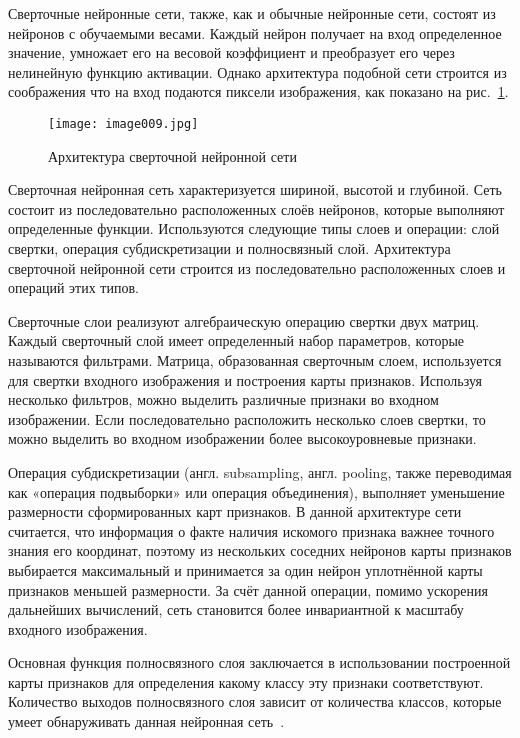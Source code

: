 Сверточные нейронные сети, также, как и обычные нейронные сети, состоят из нейронов с обучаемыми весами. Каждый нейрон получает на вход определенное значение, умножает его на весовой коэффициент и преобразует его через нелинейную функцию активации. Однако архитектура подобной сети строится из соображения что на вход подаются пиксели изображения, как показано на рис.~\ref{fig:image009}. 

\begin{figure}[htbp]
\centering
\texttt{[image: image009.jpg]}
\caption{Архитектура сверточной нейронной сети~\cite{eleven}}%
\label{fig:image009}
\end{figure}

Сверточная нейронная сеть характеризуется шириной, высотой и глубиной. Сеть состоит из последовательно расположенных слоёв нейронов, которые выполняют определенные функции. Используются следующие типы слоев и операции: слой свертки, операция субдискретизации и полносвязный слой. Архитектура сверточной нейронной сети строится из последовательно расположенных слоев и операций этих типов.

Сверточные слои реализуют алгебраическую операцию свертки двух матриц. Каждый сверточный слой имеет определенный набор параметров, которые называются фильтрами. Матрица, образованная сверточным слоем, используется для свертки входного изображения и построения карты признаков. Используя несколько фильтров, можно выделить различные признаки во входном изображении. Если последовательно расположить несколько слоев свертки, то можно выделить во входном изображении более высокоуровневые признаки.

Операция субдискретизации (англ. subsampling, англ. pooling, также переводимая как «операция подвыборки» или операция объединения), выполняет уменьшение размерности сформированных карт признаков. В данной архитектуре сети считается, что информация о факте наличия искомого признака важнее точного знания его координат, поэтому из нескольких соседних нейронов карты признаков выбирается максимальный и принимается за один нейрон уплотнённой карты признаков меньшей размерности. За счёт данной операции, помимо ускорения дальнейших вычислений, сеть становится более инвариантной к масштабу входного изображения.

Основная функция полносвязного слоя заключается в использовании построенной карты признаков для определения какому классу эту признаки соответствуют. Количество выходов полносвязного слоя зависит от количества классов, которые умеет обнаруживать данная нейронная сеть~\cite{twelve}.

